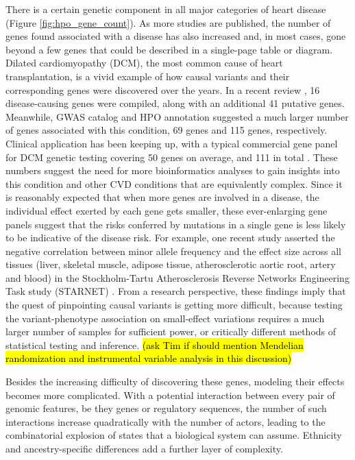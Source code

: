 \documentclass[letter]{bioinfo}
\begin{document}
There is a certain genetic component in all major categories of heart disease (Figure \ref{fig:hpo_gene_count}).  As more studies are published, the number of genes found associated with a disease has also increased and, in most cases, gone beyond a few genes that could be described in a single-page table or diagram.  Dilated cardiomyopathy (DCM), the most common cause of heart transplantation, is a vivid example of how causal variants and their corresponding genes were discovered over the years.  In a recent review \citep{Burke:2016:Clinical}, 16 disease-causing genes were compiled, along with an additional 41 putative genes.  Meanwhile, GWAS catalog and HPO annotation suggested a much larger number of genes associated with this condition, 69 genes and 115 genes, respectively.  Clinical application has been keeping up, with a typical commercial gene panel for DCM genetic testing covering 50 genes on average, and 111 in total \citep{McNally:2017:Dilated}.  These numbers suggest the need for more bioinformatics analyses to gain insights into this condition and other CVD conditions that are equivalently complex.  Since it is reasonably expected that when more genes are involved in a disease, the individual effect exerted by each gene gets smaller, these ever-enlarging gene panels suggest that the risks conferred by mutations in a single gene is less likely to be indicative of the disease risk.  For example, one recent study asserted the negative correlation between minor allele frequency and the effect size across all tissues (liver, skeletal muscle, adipose tissue, atherosclerotic aortic root, artery and blood) in the Stockholm-Tartu Atherosclerosis Reverse Networks Engineering Task study (STARNET) \citep{Franzen:2016:Cardiometabolic}.  From a research perspective, these findings imply that the quest of pinpointing causal variants is getting more difficult, because testing the variant-phenotype association on small-effect variations requires a much larger number of samples for sufficient power, or critically different methods of statistical testing and inference. \hl{(ask Tim if should mention Mendelian randomization and instrumental variable analysis in this discussion)}
	
	
Besides the increasing difficulty of discovering these genes, modeling their effects becomes more complicated. With a potential interaction between every pair of genomic features, be they genes or regulatory sequences, the number of such interactions increase quadratically with the number of actors, leading to the combinatorial explosion of states that a biological system can assume.  Ethnicity and ancestry-specific differences add a further layer of complexity. 
	
\end{document}
